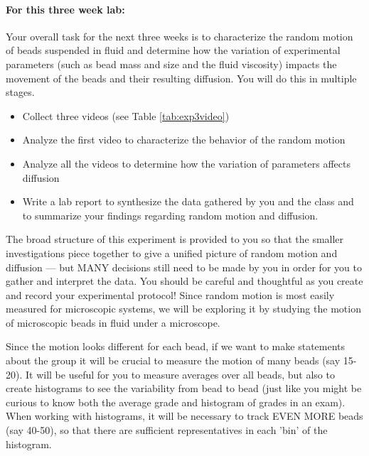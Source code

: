 \paragraph{For this three week lab:}Your overall task for the next three weeks is to characterize the random motion of beads suspended in fluid and determine how the variation of experimental parameters (such as bead mass and size and the fluid viscosity) impacts the movement of the beads and their resulting diffusion.
You will do this in multiple stages.
\begin{itemize}
\item Collect three videos (see Table \ref{tab:exp3video})
\item Analyze the first video to characterize the behavior of the random motion
\item Analyze all the videos to determine how the variation of parameters affects diffusion
\item Write a lab report to synthesize the data gathered by you and the class and to
summarize your findings regarding random motion and diffusion.
\end{itemize}
\par 
The broad structure of this experiment is provided to you so that the smaller investigations piece together to give a unified picture of random motion and diffusion — but MANY decisions still need to be made by you in order for you to gather and interpret the data.
You should be careful and thoughtful as you create and record your experimental protocol!
Since random motion is most easily measured for microscopic systems, we will be exploring it by studying the motion of microscopic beads in fluid under a microscope.
\par
Since the motion looks different for each bead, if we want to make statements about the group it will be crucial to measure the motion of many beads (say 15-20).
It will be useful for you to measure averages over all beads, but also to create histograms to see the variability from bead to bead (just like you might be curious to know both the average grade and histogram of grades in an exam).
When working with histograms, it will be necessary to track EVEN MORE beads (say 40-50), so that there are sufficient representatives in each 'bin' of the histogram.
